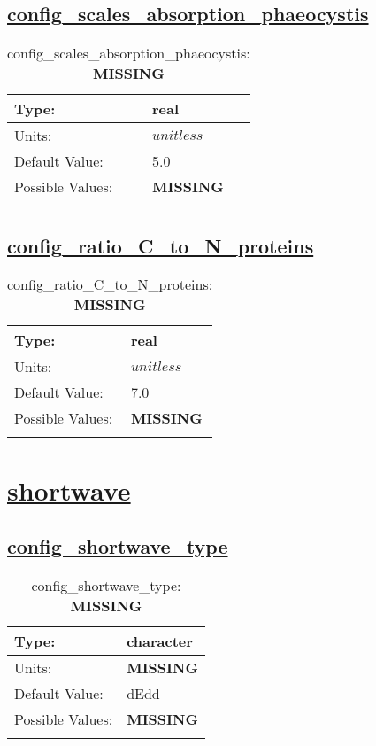 \subsection[config\_scales\_absorption\_phaeocystis]{\hyperref[sec:nm_tab_biogeochemistry]{config\_scales\_absorption\_phaeocystis}}
\label{subsec:nm_sec_config_scales_absorption_phaeocystis}
\begin{center}
\begin{longtable}{| p{2.0in} || p{4.0in} |}
    \hline
    Type: & real \\
    \hline
    Units: & $unitless$ \\
    \hline
    Default Value: & 5.0 \\
    \hline
    Possible Values: & {\bf \color{red} MISSING} \\
    \hline
    \caption{config\_scales\_absorption\_phaeocystis: {\bf \color{red} MISSING}}
\end{longtable}
\end{center}
\subsection[config\_ratio\_C\_to\_N\_proteins]{\hyperref[sec:nm_tab_biogeochemistry]{config\_ratio\_C\_to\_N\_proteins}}
\label{subsec:nm_sec_config_ratio_C_to_N_proteins}
\begin{center}
\begin{longtable}{| p{2.0in} || p{4.0in} |}
    \hline
    Type: & real \\
    \hline
    Units: & $unitless$ \\
    \hline
    Default Value: & 7.0 \\
    \hline
    Possible Values: & {\bf \color{red} MISSING} \\
    \hline
    \caption{config\_ratio\_C\_to\_N\_proteins: {\bf \color{red} MISSING}}
\end{longtable}
\end{center}
\section[shortwave]{\hyperref[sec:nm_tab_shortwave]{shortwave}}
\label{sec:nm_sec_shortwave}
\subsection[config\_shortwave\_type]{\hyperref[sec:nm_tab_shortwave]{config\_shortwave\_type}}
\label{subsec:nm_sec_config_shortwave_type}
\begin{center}
\begin{longtable}{| p{2.0in} || p{4.0in} |}
    \hline
    Type: & character \\
    \hline
    Units: & {\bf \color{red} MISSING} \\
    \hline
    Default Value: & dEdd \\
    \hline
    Possible Values: & {\bf \color{red} MISSING} \\
    \hline
    \caption{config\_shortwave\_type: {\bf \color{red} MISSING}}
\end{longtable}
\end{center}

